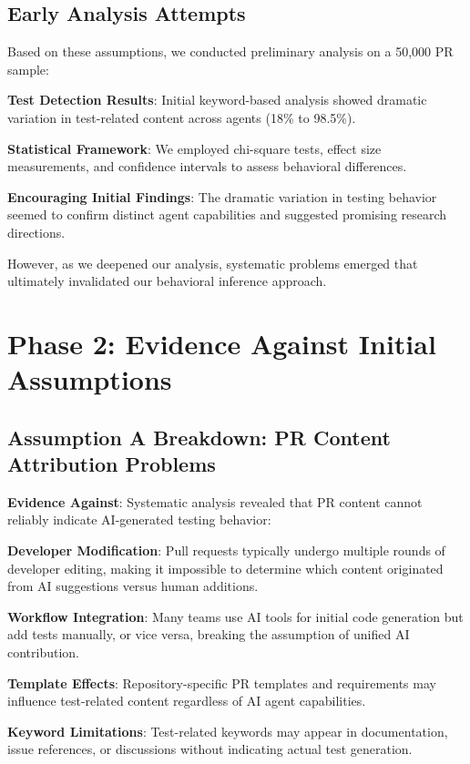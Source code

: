 \documentclass[conference]{IEEEtran}
\begin{document}
\subsection{Early Analysis Attempts}

Based on these assumptions, we conducted preliminary analysis on a 50,000 PR sample:

\textbf{Test Detection Results}: Initial keyword-based analysis showed dramatic variation in test-related content across agents (18\% to 98.5\%).

\textbf{Statistical Framework}: We employed chi-square tests, effect size measurements, and confidence intervals to assess behavioral differences.

\textbf{Encouraging Initial Findings}: The dramatic variation in testing behavior seemed to confirm distinct agent capabilities and suggested promising research directions.

However, as we deepened our analysis, systematic problems emerged that ultimately invalidated our behavioral inference approach.

\section{Phase 2: Evidence Against Initial Assumptions}

\subsection{Assumption A Breakdown: PR Content Attribution Problems}

\textbf{Evidence Against}: Systematic analysis revealed that PR content cannot reliably indicate AI-generated testing behavior:

\textbf{Developer Modification}: Pull requests typically undergo multiple rounds of developer editing, making it impossible to determine which content originated from AI suggestions versus human additions.

\textbf{Workflow Integration}: Many teams use AI tools for initial code generation but add tests manually, or vice versa, breaking the assumption of unified AI contribution.

\textbf{Template Effects}: Repository-specific PR templates and requirements may influence test-related content regardless of AI agent capabilities.

\textbf{Keyword Limitations}: Test-related keywords may appear in documentation, issue references, or discussions without indicating actual test generation.
\end{document}
